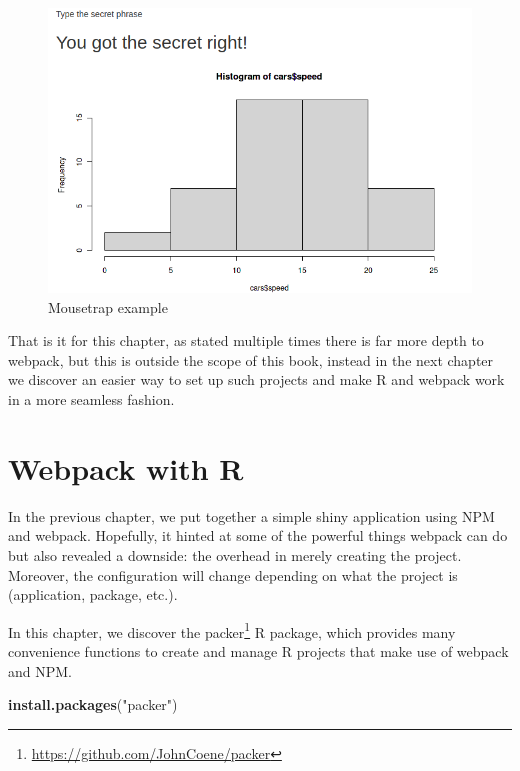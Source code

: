 \documentclass[
]{krantz}
\makeatletter
\newenvironment{Shaded}{\begin{snugshade}}{\end{snugshade}}
\newcommand{\KeywordTok}[1]{\textcolor[rgb]{0.27,0.27,0.27}{\textbf{#1}}}
\newcommand{\NormalTok}[1]{#1}
\newcommand{\StringTok}[1]{\textcolor[rgb]{0.5,0.5,0.5}{#1}}
\renewcommand{\href}[2]{#2\footnote{\url{#1}}}
\newenvironment{kframe}{%
\medskip{}
\setlength{\fboxsep}{.8em}
 \def\at@end@of@kframe{}%
 \ifinner\ifhmode%
  \def\at@end@of@kframe{\end{minipage}}%
  \begin{minipage}{\columnwidth}%
 \fi\fi%
 \def\FrameCommand##1{\hskip\@totalleftmargin \hskip-\fboxsep
 \colorbox{shadecolor}{##1}\hskip-\fboxsep
     \hskip-\linewidth \hskip-\@totalleftmargin \hskip\columnwidth}%
 \MakeFramed {\advance\hsize-\width
   \@totalleftmargin\z@ \linewidth\hsize
   \@setminipage}}%
 {\par\unskip\endMakeFramed%
 \at@end@of@kframe}
\renewenvironment{Shaded}{\begin{kframe}}{\end{kframe}}
\makeatother
\begin{document}
\begin{figure}[t]

{\centering \includegraphics[width=1\linewidth]{images/mousetrap} 

}

\caption{Mousetrap example}\label{fig:mousetrap}
\end{figure}

That is it for this chapter, as stated multiple times there is far more depth to webpack, but this is outside the scope of this book, instead in the next chapter we discover an easier way to set up such projects and make R and webpack work in a more seamless fashion.

\hypertarget{packer-overview}{%
\chapter{Webpack with R}\label{packer-overview}}

In the previous chapter, we put together a simple shiny application using NPM and webpack. Hopefully, it hinted at some of the powerful things webpack can do but also revealed a downside: the overhead in merely creating the project. Moreover, the configuration will change depending on what the project is (application, package, etc.).

In this chapter, we discover the \href{https://github.com/JohnCoene/packer}{packer} \citep{R-packer} R package, which provides many convenience functions to create and manage R projects that make use of webpack and NPM.

\begin{Shaded}
\begin{Highlighting}[]
\KeywordTok{install.packages}\NormalTok{(}\StringTok{"packer"}\NormalTok{)}
\end{Highlighting}
\end{Shaded}
\end{document}
